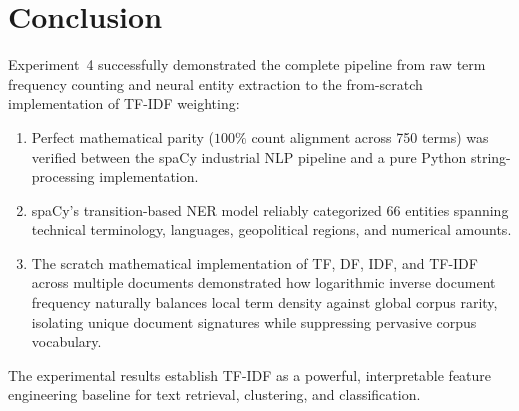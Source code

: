 \section{Conclusion}
Experiment~4 successfully demonstrated the complete pipeline from raw term frequency counting and neural entity extraction to the from-scratch implementation of TF-IDF weighting:
\begin{enumerate}
    \item Perfect mathematical parity ($100\%$ count alignment across 750 terms) was verified between the spaCy industrial NLP pipeline and a pure Python string-processing implementation.
    \item spaCy's transition-based NER model reliably categorized 66 entities spanning technical terminology, languages, geopolitical regions, and numerical amounts.
    \item The scratch mathematical implementation of TF, DF, IDF, and TF-IDF across multiple documents demonstrated how logarithmic inverse document frequency naturally balances local term density against global corpus rarity, isolating unique document signatures while suppressing pervasive corpus vocabulary.
\end{enumerate}
The experimental results establish TF-IDF as a powerful, interpretable feature engineering baseline for text retrieval, clustering, and classification.
